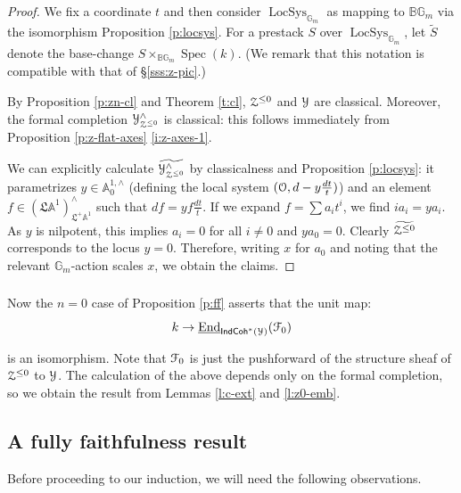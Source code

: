 \documentclass[reqno,11pt]{amsart}
\numberwithin{equation}{subsection}
\theoremstyle{remark}
\newcommand{\bA}{{\mathbb A}}
\newcommand{\bB}{{\mathbb B}}
\newcommand{\bG}{{\mathbb G}}
\newcommand{\sF}{{\EuScript F}}
\newcommand{\sO}{{\EuScript O}}
\newcommand{\sY}{{\EuScript Y}}
\newcommand{\sZ}{{\EuScript Z}}
\newcommand{\fL}{{\mathfrak L}}
\newcommand{\on}{\operatorname}
\newcommand{\ul}{\underline}
\newcommand{\End}{\on{End}}
\newcommand{\Spec}{\on{Spec}}
\newcommand{\LocSys}{\on{LocSys}}
\newcommand{\IndCoh}{\mathsf{IndCoh}}
\begin{document}
\begin{proof}

We fix a coordinate $t$ and then consider $\LocSys_{\bG_m}$ 
as mapping to $\bB \bG_m$ via the isomorphism
Proposition \ref{p:locsys}. 
For a prestack $S$ over $\LocSys_{\bG_m}$, let $\widetilde{S}$ denote
the base-change $S \times_{\bB \bG_m} \Spec(k)$. (We remark that this
notation is compatible with that of \S \ref{sss:z-pic}.)

By Proposition \ref{p:zn-cl} and Theorem \ref{t:cl}, 
$\sZ^{\leq 0}$ and $\sY$ are classical. Moreover, the formal completion
$\sY_{\sZ^{\leq 0}}^{\wedge}$ is classical: this follows immediately
from Proposition \ref{p:z-flat-axes} \eqref{i:z-axes-1}.

We can explicitly calculate $\widetilde{\sY_{\sZ^{\leq 0}}^{\wedge}}$
by classicalness and Proposition \ref{p:locsys}: it parametrizes
$y \in \bA_0^{1,\wedge}$ (defining the local system $(\sO,d-y\frac{dt}{t})$)
and an element $f \in (\fL \bA^1)_{\fL^+ \bA^1}^{\wedge}$
such that $df = y f \frac{dt}{t}$. 
If we expand  $f = \sum a_i t^i$, we find $i a_i = y a_i$. As $y$ is
nilpotent, this implies $a_i = 0$ for all $i \neq 0$ and $y a_0 = 0$.
Clearly $\widetilde{\sZ^{\leq 0}}$ corresponds to the locus $y = 0$.
Therefore, writing $x$ for $a_0$ and noting that the relevant $\bG_m$-action
scales $x$, we obtain the claims.

\end{proof}

\subsubsection{}

Now the $n = 0$ case of Proposition \ref{p:ff} asserts that the unit map:
%
\[
k \to \ul{\End}_{\IndCoh^*(\sY)}(\sF_0)
\]

\noindent is an isomorphism. Note that $\sF_0$ is just the pushforward
of the structure sheaf of $\sZ^{\leq 0}$ to $\sY$. The calculation of
the above depends only on the formal completion, so we
obtain the result from Lemmas \ref{l:c-ext} and \ref{l:z0-emb}.

\subsection{A fully faithfulness result}

Before proceeding to our induction, we will need the following observations.

\subsubsection{}
\end{document}
